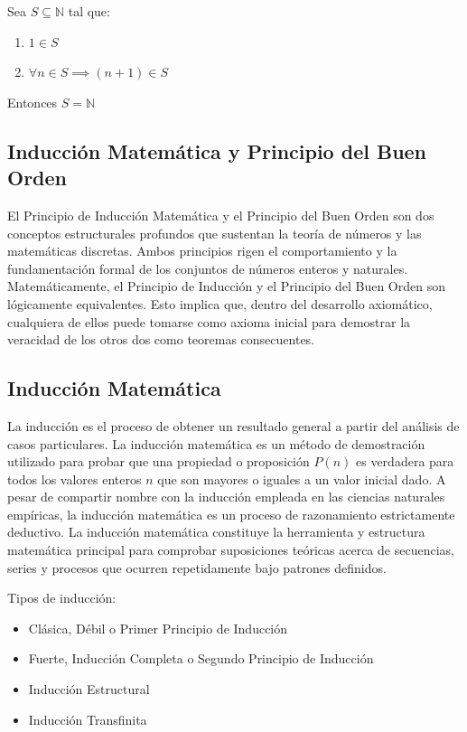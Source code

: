 \documentclass{article}
\begin{document}
\bigskip

Sea $S \subseteq \mathbb{N}$ tal que:
\begin{enumerate}
    \item $1 \in S$
    \item $\forall n \in S \implies (n+1) \in S$
\end{enumerate}
Entonces $S = \mathbb{N}$

\subsection{Inducción Matemática y Principio del Buen Orden}
\label{sec:induccion-buen-orden}

El Principio de Inducción Matemática y el Principio del Buen Orden son dos conceptos estructurales profundos que sustentan la teoría de números y las matemáticas discretas. Ambos principios rigen el comportamiento y la fundamentación formal de los conjuntos de números enteros y naturales. Matemáticamente, el Principio de Inducción y el Principio del Buen Orden son lógicamente equivalentes. Esto implica que, dentro del desarrollo axiomático, cualquiera de ellos puede tomarse como axioma inicial para demostrar la veracidad de los otros dos como teoremas consecuentes.

\subsection{Inducción Matemática}
\label{sec:induccion-matematica}

La inducción es el proceso de obtener un resultado general a partir del análisis de casos particulares. La inducción matemática es un método de demostración utilizado para probar que una propiedad o proposición $P(n)$ es verdadera para todos los valores enteros $n$ que son mayores o iguales a un valor inicial dado. A pesar de compartir nombre con la inducción empleada en las ciencias naturales empíricas, la inducción matemática es un proceso de razonamiento estrictamente deductivo. La inducción matemática constituye la herramienta y estructura matemática principal para comprobar suposiciones teóricas acerca de secuencias, series y procesos que ocurren repetidamente bajo patrones definidos.

\bigskip

Tipos de inducción:

\begin{itemize}
    \item Clásica, Débil o Primer Principio de Inducción 
    \item Fuerte, Inducción Completa o Segundo Principio de Inducción
    \item Inducción Estructural
    \item Inducción Transfinita
\end{itemize}
\end{document}
